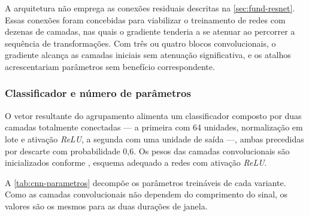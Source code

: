 A arquitetura não emprega as conexões residuais descritas na
\autoref{sec:fund-resnet}. Essas conexões foram concebidas para viabilizar o
treinamento de redes com dezenas de camadas, nas quais o gradiente tenderia a
se atenuar ao percorrer a sequência de transformações. Com três ou quatro
blocos convolucionais, o gradiente alcança as camadas iniciais sem atenuação
significativa, e os atalhos acrescentariam parâmetros sem benefício
correspondente.

\subsubsection{Classificador e número de parâmetros}
\label{subsubsec:fund-cnn-classificador}

O vetor resultante do agrupamento alimenta um classificador composto por
duas camadas totalmente conectadas --- a primeira com 64 unidades,
normalização em lote e ativação \textit{ReLU}, a segunda com uma unidade de
saída ---, ambas precedidas por descarte com probabilidade 0,6. Os pesos das
camadas convolucionais são inicializados conforme ,
esquema adequado a redes com ativação \textit{ReLU}.

A \autoref{tab:cnn-parametros} decompõe os parâmetros treináveis de cada
variante. Como as camadas convolucionais não dependem do comprimento do
sinal, os valores são os mesmos para as duas durações de janela.

\begin{table}[h!]
	\captionsetup{width=13.5cm}
\end{table}

